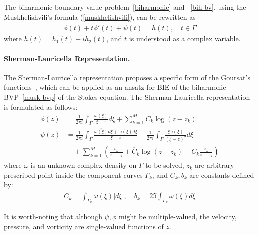 \documentclass[10pt,twocolumn,letterpaper]{article}
\begin{document}
The biharmonic boundary value problem~\eqref{biharmonic} and ~\eqref{bih-bv}, using
the Muskhelishvili's formula (\ref{muskhelishvili}), can be rewritten as
\begin{align}
  \phi(t) + t\overline{\phi'(t)} + \overline{\psi(t)} = h(t), 
  \quad t \in \Gamma \label{musk-bvp}
\end{align} where $h(t) =  h_1(t) + i h_2(t)$,  
and $t$ is understood as a complex variable.

\paragraph{Sherman-Lauricella Representation.} 
The Sherman-Lauricella representation proposes a specific form of 
the Goursat's functions~\cite{greengardIntegralEquationMethods1996}, 
which can be applied as an ansatz for BIE of the biharmonic BVP~\eqref{musk-bvp} of 
the Stokes equation. 
The Sherman-Lauricella representation is formulated as follows:
\begin{align}
  \phi(z) & =
  \frac {1}{2\pi i} \int_\Gamma \frac{\omega(\xi)}{\xi - z} d\xi
  + \sum_{k=1}^M C_k \log (z-z_k) \label{sl-phi}
  \\
  \psi(z) & =
  \frac {1}{2\pi i} \int_\Gamma \frac{\overline{\omega(\xi)}d\xi +  \omega(\xi)\overline{d\xi}}{\xi - z}
  - \frac {1}{2\pi i} \int_\Gamma \frac{\overline{\xi} \omega(\xi)}{{(\xi - z)}^2} d\xi  \label{sl-psi}
  \\
          & \quad + \sum _{k=1}^M
  \left( \frac{b_k}{z-z_k} + \overline C_k \log (z-z_k) -  C_k \frac{\overline z_k}{z-z_k} \right) \nonumber
\end{align}
where $\omega$ is an unknown complex density on $\Gamma$ to be solved,
$z_k$ are arbitrary prescribed point inside the component curves $\Gamma_k$,
and $C_k, b_k$ are constants defined by:
\begin{align}
  C_k = \int_{\Gamma_k} \omega(\xi) |d\xi|, \quad b_k = 2 \Im\int_{\Gamma_k} \overline{\omega(\xi)} {d\xi}
\end{align}

It is worth-noting that although $\psi, \phi$ might be multiple-valued, 
the velocity, pressure, and vorticity are single-valued functions of $z$.
\end{document}
